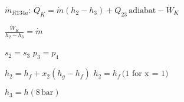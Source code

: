 \( \dot{m}_{R134a} \):  
\( \dot{Q}_{K} = \dot{m} (h_2 - h_3) + Q_{23} \, \text{adiabat} - \dot{W}_K \)  

\( \frac{\dot{W}_K}{h_2 - h_3} = \dot{m} \)  

\( s_2 = s_3 \)  
\( p_3 = p_4 \)  

\( h_2 = h_f + x_2 (h_g - h_f) \)  
\( h_2 = h_f \, \text{(1 for x = 1)} \)  

\( h_3 = h(8 \, \text{bar}) \)